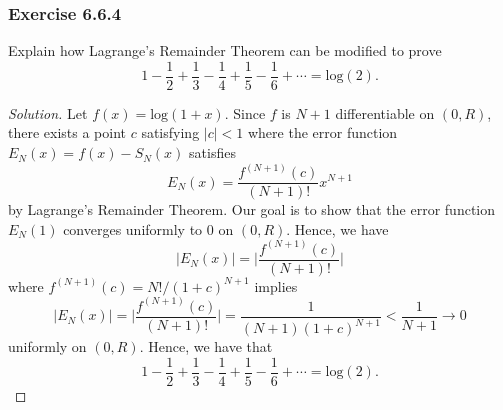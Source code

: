 \subsubsection{Exercise 6.6.4} Explain how Lagrange's Remainder Theorem can be modified to prove 
\[  1 - \frac{ 1 }{ 2 } + \frac{ 1 }{ 3 } - \frac{ 1 }{ 4 }  + \frac{ 1 }{ 5 } - \frac{ 1 }{ 6 } + \dotsb = \text{log}(2). \]
\begin{proof}[Solution]
    Let \( f(x) = \text{log}(1+x) \). Since \( f  \) is \( N+1 \) differentiable on \( (0,R )  \), there exists a point \( c  \) satisfying \(  | c |    < 1  \) where the error function \( E_{N}(x) = f(x) - S_{N}(x) \) satisfies 
    \[  E_{N}(x) = \frac{ f^{(N+1)}(c) }{ (N+1)! } x^{N+1}  \]
    by Lagrange's Remainder Theorem.
    Our goal is to show that the error function \( E_{N}(1) \) converges uniformly to \( 0  \) on \( (0,R ) \). Hence, we have 
    \[ | E_{N}(x) | = \Big| \frac{ f^{(N+1)}(c) }{ (N+1)! }  \Big|  \]
    where \( f^{(N+1)}(c) =  N! / (1+c)^{N+1}   \) implies 
    \[  | E_{N}(x) | = \Big| \frac{ f^{(N+1)}(c) }{ (N+1)! }  \Big| =  \frac{ 1 }{ (N+1)(1+c)^{N+1}  }   < \frac{ 1 }{ N+1 } \to 0     \]
   uniformly on \( (0,R ) \). Hence, we have that 
   \[ 1 - \frac{ 1 }{ 2 } + \frac{ 1 }{ 3 } - \frac{ 1 }{ 4 } + \frac{ 1 }{ 5 } - \frac{ 1 }{ 6  }  + \dotsb = \text{log}(2).  \]
\end{proof}


